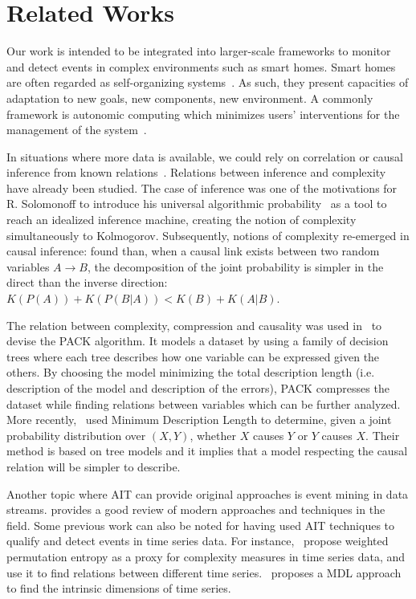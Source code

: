 \documentclass[entropy,article,submit,moreauthors,pdftex]{Definitions/mdpi}
\begin{document}
\section{Related Works}
\label{sec:related}
Our work is intended to be integrated into larger-scale frameworks to monitor
and detect events in complex environments such as smart homes. Smart homes are often regarded as self-organizing systems~\cite{kramer_rigorous_2009,kounev_notion_2017}. As such, they present capacities of adaptation to new goals,
new components, new environment. A commonly framework is 
autonomic computing which minimizes users' interventions for the management of the
system~\cite{kounev_notion_2017,kephart_vision_2003}.

In situations where more data is available, we could rely
on correlation or causal inference from known relations~\cite{peters_elements_2017,fadiga_or_2021}. Relations between inference and complexity have already been studied. The
case of inference was one of the motivations for R. Solomonoff to introduce his
universal algorithmic probability~\cite{solomonoff_formal_1964} as a tool to
reach an idealized inference machine, creating the notion of complexity simultaneously
to Kolmogorov. Subsequently, notions of complexity re-emerged in causal inference:
\cite{janzing_causal_2010} found than, when a causal link exists between two random variables $A \rightarrow B$, the decomposition of the joint probability is simpler in the direct than the inverse direction: $K(P(A)) + K(P(B|A)) < K(B) + K(A|B)$.

The relation between complexity, compression and causality was used in~\cite{tatti_finding_2008} to devise the PACK algorithm. It models a dataset by using a family of decision trees where each tree describes how one variable can be expressed given the others. By choosing the model minimizing the total description length (i.e. description of the model and description of the errors), PACK compresses the dataset while finding relations between variables which can be further analyzed. More recently,~\cite{marx_causal_2018} used Minimum Description Length to determine, given a joint probability distribution over $(X,Y)$, whether $X$ causes $Y$ or $Y$ causes $X$. Their method is based on tree models and it implies that a model respecting the causal relation will be simpler to describe.


Another topic where AIT can provide original approaches is event mining in data streams.
\cite{aggarwal_outlier_2017} provides a good review of modern approaches and techniques
in the field. Some previous work can also be noted for having used AIT techniques to qualify and detect events in time series data. For instance,~\cite{batista_complexity-invariant_2011,fadlallah_weighted-permutation_2013} propose weighted permutation entropy as a proxy for complexity measures in time series data, and use it to find relations between different time series.~\cite{hu_discovering_2011} proposes a MDL approach to find the intrinsic dimensions of time series.
\end{document}

